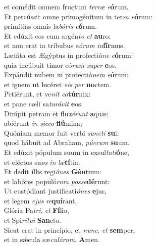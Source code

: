 \evenverse et comédit omnem fructum \textit{ter}\textit{ræ} \textit{e}\textbf{ó}rum.\\
\oddverse Et percússit omne primogénitum in ter\textit{ra} \textit{e}\textbf{ó}rum:~\*\\
\oddverse primítias omnis la\textit{bó}\textit{ris} \textit{e}\textbf{ó}rum.\\
\evenverse Et edúxit eos cum argén\textit{to} \textit{et} \textbf{au}ro:~\*\\
\evenverse et non erat in tríbubus e\textit{ó}\textit{rum} \textit{in}\textbf{fír}mus.\\
\oddverse Lætáta est Ægýptus in profectió\textit{ne} \textit{e}\textbf{ó}rum:~\*\\
\oddverse quia incúbuit timor eó\textit{rum} \textit{su}\textit{per} \textbf{e}os.\\
\evenverse Expándit nubem in protectió\textit{nem} \textit{e}\textbf{ó}rum:~\*\\
\evenverse et ignem ut lucéret \textit{e}\textit{is} \textit{per} \textbf{no}ctem.\\
\oddverse Petiérunt, et ve\textit{nit} \textit{co}\textbf{túr}nix:~\*\\
\oddverse et pane cæli sa\textit{tu}\textit{rá}\textit{vit} \textbf{e}os.\\
\evenverse Dirúpit petram et flu\textit{xé}\textit{runt} \textbf{a}quæ:~\*\\
\evenverse abiérunt \textit{in} \textit{sic}\textit{co} \textbf{flú}mina;\\
\oddverse Quóniam memor fuit verbi \textit{san}\textit{cti} \textbf{su}i:~\*\\
\oddverse quod hábuit ad Abraham, \textit{pú}\textit{e}\textit{rum} \textbf{su}um.\\
\evenverse Et edúxit pópulum suum in exsul\textit{ta}\textit{ti}\textbf{ó}ne,~\*\\
\evenverse et eléctos su\textit{os} \textit{in} \textit{læ}\textbf{tí}tia.\\
\oddverse Et dedit illis regi\textit{ó}\textit{nes} \textbf{Gén}tium:~\*\\
\oddverse et labóres populó\textit{rum} \textit{pos}\textit{se}\textbf{dé}runt:\\
\evenverse Ut custódiant justificati\textit{ó}\textit{nes} \textbf{e}jus,~\*\\
\evenverse et legem \textit{e}\textit{jus} \textit{re}\textbf{quí}rant.\\
\oddverse Glória Pa\textit{tri}, \textit{et} \textbf{Fí}lio,~\*\\
\oddverse et Spi\textit{rí}\textit{tu}\textit{i} \textbf{San}cto.\\
\evenverse Sicut erat in princípio, et \textit{nunc}, \textit{et} \textbf{sem}per,~\*\\
\evenverse et in sǽcula sæ\textit{cu}\textit{ló}\textit{rum}. \textbf{A}men.\\
